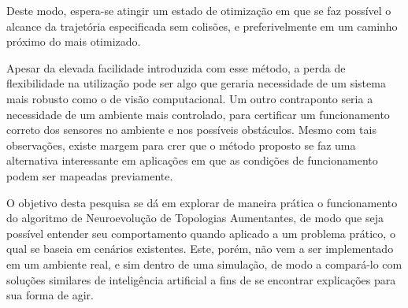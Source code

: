 Deste modo, espera-se atingir um estado de otimização em que se faz
possível o alcance da trajetória especificada sem colisões, e preferivelmente em
um caminho próximo do mais otimizado.

Apesar da elevada facilidade introduzida com esse método, a perda de
flexibilidade na utilização pode ser algo que geraria necessidade de um sistema
mais robusto como o de visão computacional. Um outro contraponto seria a
necessidade de um ambiente mais controlado, para certificar um funcionamento
correto dos sensores no ambiente e nos possíveis obstáculos. Mesmo com tais
observações, existe margem para crer que o método proposto se faz uma
alternativa interessante em aplicações em que as condições de funcionamento
podem ser mapeadas previamente.

O objetivo desta pesquisa se dá em explorar de maneira prática o funcionamento do
algoritmo de Neuroevolução de Topologias Aumentantes, de modo que seja possível 
entender seu comportamento quando aplicado a um problema prático, o qual se baseia
em cenários existentes. Este, porém, não vem a ser implementado em um ambiente real,
e sim dentro de uma simulação, de modo a compará-lo com soluções similares de 
inteligência artificial a fins de se encontrar explicações para sua forma de agir.